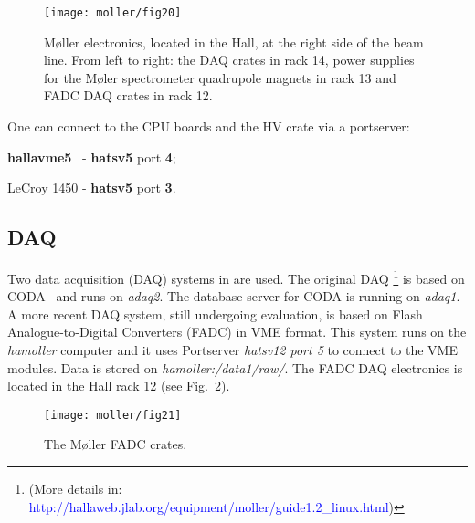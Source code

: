 {   \begin{figure}%
      \begin{center}
          \texttt{[image: moller/fig20]}
      \end{center}
      \caption [M{\o}ller:electronics crates.] {M{\o}ller electronics, located
             in the Hall, at the right side of the beam line. From left to right:
             the DAQ crates in rack 14, power supplies for the M{\o}ler 
             spectrometer quadrupole magnets in rack 13 and FADC DAQ crates in rack 12.
            }
      \label{fig:electronics} 
   \end{figure}  

One can connect to the CPU boards and the HV crate via a portserver:
\vspace{-\parskip}
\begin{list}{}{\setlength{\itemsep}{-0.15cm}}
  \item[1.] {\bf hallavme5}~ - {\bf hatsv5} port {\bf 4};
  \item[4.] LeCroy 1450 - {\bf hatsv5} port {\bf 3}.
\end{list}

\subsection {DAQ}
\label{sec:moller_compon_daq}
\vspace{-\parskip}
Two data acquisition (DAQ) systems in are used. The original DAQ%
\footnote{(More details in: 
\textcolor{blue}{http://hallaweb.jlab.org/equipment/moller/guide1.2\_linux.html})} 
 is based on CODA~\cite{CODAwww} and runs on {\it adaq2}.
 The database server for CODA is running on {\it adaq1}. A more recent DAQ system, still undergoing evaluation, is based on Flash Analogue-to-Digital Converters (FADC) in VME format. This system runs on the {\it hamoller} computer and it uses Portserver {\it hatsv12 port 5} to connect to the VME modules.
Data is stored on 
{\it hamoller:/data1/raw/}. The FADC DAQ 
 electronics is located in the Hall rack 12 (see Fig.~\ref{fig:fadc}).
 
   \begin{figure}%
      \begin{center}
          \texttt{[image: moller/fig21]}
      \end{center}
      \caption[M{\o}ller:fadc]{The M{\o}ller FADC crates.
            }
      \label{fig:fadc} 
   \end{figure}  

}
